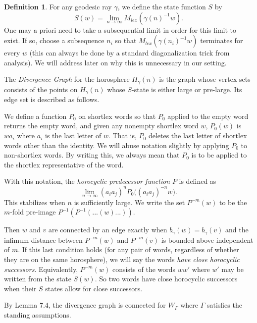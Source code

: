 \documentclass{amsart}
\theoremstyle{definition}
\newtheorem{definition}[theorem]{Definition}
\theoremstyle{remark}
\begin{document}
	\begin{definition}
		
		For any geodesic ray $\gamma$, we define the state function $S$ by $$S(w)=\lim_{n\to\infty} M_{lex}( \gamma(n)^{-1} w).$$ One may a priori need to take a subsequential limit in order for this limit to exist. If so, choose a subsequence $n_i$ so that $M_{lex}( \gamma(n_i)^{-1} w)$ terminates for every $w$ (this can always be done by a standard diagonalization trick from analysis). We will address later on why this is unnecessary in our setting.
		
		The \textit{Divergence Graph} for the horosphere $H_\gamma(n)$ is the graph whose vertex sets consists of the points on $H_\gamma(n)$ whose $S$-state is either large or pre-large. Its edge set is described as follows.
		
		We define a function $P_0$ on shortlex words so that $P_0$ applied to the empty word returns the empty word, and given any nonempty shortlex word $w$, $P_0(w)$ is $wa_i$ where $a_i$ is the last letter of $w$. That is, $P_0$ deletes the last letter of shortlex words other than the identity. We will abuse notation slightly by applying $P_0$ to non-shortlex words. By writing this, we always mean that $P_0$ is to be applied to the shortlex representative of the word.
		
		With this notation, the \textit{horocyclic predecessor function} $P$ is defined as $$\lim_{n\to\infty} (a_ia_j)^nP_0\bigl( (a_ia_j)^{-n}w\bigr).$$ This stabilizes when $n$ is sufficiently large. We write the set $P^{-m}(w)$ to be the $m$-fold pre-image $P^{-1}(P^{-1}(...(w)...))$. 
		
		Then $w$ and $v$ are connected by an edge exactly when $b_\gamma(w)=b_\gamma(v)$ and the infimum distance between $P^{-m}(w)$ and $P^{-m}(v)$ is bounded above independent of $m$. If this last condition holds (for any pair of words, regardless of whether they are on the same horosphere), we will say the words \textit{have close horocyclic successors}. Equivalently, $P^{-m}(w)$ consists of the words $ww'$ where $w'$ may be written from the state $S(w)$. So two words have close horocyclic successors when their $S$ states allow for close successors.
		
	\end{definition}
	
	By \cite{CGSR} Lemma 7.4, the divergence graph is connected for $W_\Gamma$ where $\Gamma$ satisfies the standing assumptions.
	
\end{document}
